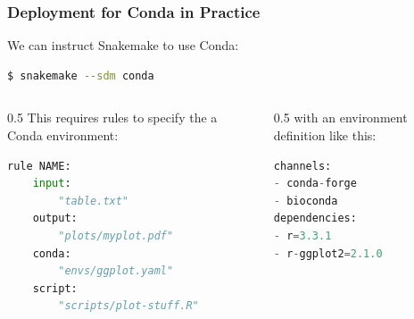 \begin{frame}[fragile]
	\frametitle{Deployment for Conda in Practice}
	  We can instruct Snakemake to use Conda:
	  \begin{lstlisting}[language=Bash, style=Shell]
$ snakemake --sdm conda 
	\end{lstlisting}
    \begin{columns}
    	\begin{column}{0.5\textwidth}
    		This requires rules to specify the a Conda environment:
    		\begin{lstlisting}[language=Python,style=Python]
rule NAME:
    input:
    	"table.txt"
    output:
    	"plots/myplot.pdf"
    conda:
    	"envs/ggplot.yaml"
    script:
        "scripts/plot-stuff.R"
    		\end{lstlisting}
    	\end{column}
        \begin{column}{0.5\textwidth}
        	\pause
        	with an environment definition like this:
            \begin{lstlisting}[language=Python,style=Python]
channels:
- conda-forge
- bioconda
dependencies:
- r=3.3.1
- r-ggplot2=2.1.0
           \end{lstlisting}	
        \end{column}
    \end{columns}
\end{frame}

